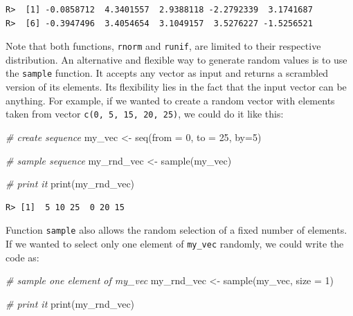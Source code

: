 \documentclass[
  12pt,
]{book}
\newenvironment{Shaded}{\begin{snugshade}}{\end{snugshade}}
\newcommand{\AttributeTok}[1]{\textcolor[rgb]{0.61,0.61,0.61}{#1}}
\newcommand{\CommentTok}[1]{\textcolor[rgb]{0.37,0.37,0.37}{\textit{#1}}}
\newcommand{\DecValTok}[1]{\textcolor[rgb]{0.06,0.06,0.06}{#1}}
\newcommand{\FunctionTok}[1]{\textcolor[rgb]{0,0,0}{#1}}
\newcommand{\NormalTok}[1]{#1}
\newcommand{\OtherTok}[1]{\textcolor[rgb]{0.37,0.37,0.37}{#1}}
\begin{document}
\begin{verbatim}
R>  [1] -0.0858712  4.3401557  2.9388118 -2.2792339  3.1741687
R>  [6] -0.3947496  3.4054654  3.1049157  3.5276227 -1.5256521
\end{verbatim}

Note that both functions, \texttt{rnorm} and \texttt{runif}, are limited to their respective distribution. An alternative and flexible way to generate random values is to use the \texttt{sample} function. It accepts any vector as input and returns a scrambled version of its elements. Its flexibility lies in the fact that the input vector can be anything. For example, if we wanted to create a random vector with elements taken from vector \texttt{c(0,\ 5,\ 15,\ 20,\ 25)}, we could do it like this: 

\begin{Shaded}
\begin{Highlighting}[]
\CommentTok{\# create sequence}
\NormalTok{my\_vec }\OtherTok{\textless{}{-}} \FunctionTok{seq}\NormalTok{(}\AttributeTok{from =} \DecValTok{0}\NormalTok{, }\AttributeTok{to =} \DecValTok{25}\NormalTok{, }\AttributeTok{by=}\DecValTok{5}\NormalTok{)}

\CommentTok{\# sample sequence}
\NormalTok{my\_rnd\_vec }\OtherTok{\textless{}{-}} \FunctionTok{sample}\NormalTok{(my\_vec)}

\CommentTok{\# print it}
\FunctionTok{print}\NormalTok{(my\_rnd\_vec)}
\end{Highlighting}
\end{Shaded}

\begin{verbatim}
R> [1]  5 10 25  0 20 15
\end{verbatim}

Function \texttt{sample} also allows the random selection of a fixed number of elements. If we wanted to select only one element of \texttt{my\_vec} randomly, we could write the code as:

\begin{Shaded}
\begin{Highlighting}[]
\CommentTok{\# sample one element of my\_vec}
\NormalTok{my\_rnd\_vec }\OtherTok{\textless{}{-}} \FunctionTok{sample}\NormalTok{(my\_vec, }\AttributeTok{size =} \DecValTok{1}\NormalTok{)}

\CommentTok{\# print it}
\FunctionTok{print}\NormalTok{(my\_rnd\_vec)}
\end{Highlighting}
\end{Shaded}
\end{document}
